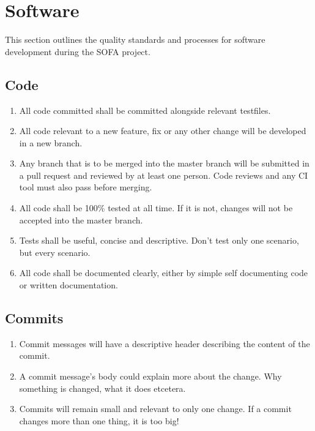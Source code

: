\section{Software}
This section outlines the quality standards and processes for software development during the SOFA project.

\subsection{Code}
\begin{enumerate}
	\item All code committed shall be committed alongside relevant testfiles.
	\item All code relevant to a new feature, fix or any other change will be developed in a new branch.
	\item Any branch that is to be merged into the master branch will be submitted in a pull request and reviewed by at least one person.
	Code reviews and any CI tool must also pass before merging.
	\item All code shall be 100\% tested at all time. If it is not, changes will not be accepted into the master branch.
	\item Tests shall be useful, concise and descriptive. Don't test only one scenario, but every scenario.
	\item All code shall be documented clearly, either by simple self documenting code or written documentation.
\end{enumerate}

\subsection{Commits}

\begin{enumerate}
	\item Commit messages will have a descriptive header describing the content of the commit.
	\item A commit message's body could explain more about the change. Why something is changed, what it does etcetera.
	\item Commits will remain small and relevant to only one change. If a commit changes more than one thing, it is too big!
\end{enumerate}